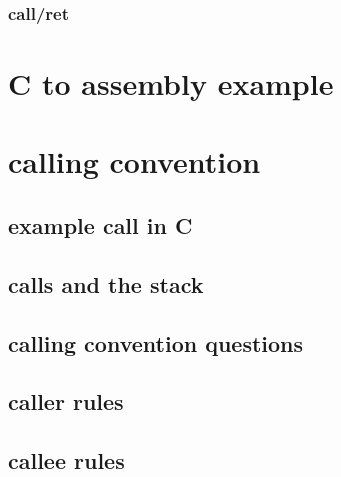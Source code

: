 

\subsubsection{call/ret}



\section{C to assembly example}




\section{calling convention}

\subsection{example call in C}




\subsection{calls and the stack}



\subsection{calling convention questions}



\subsection{caller rules}



\subsection{callee rules}

%












